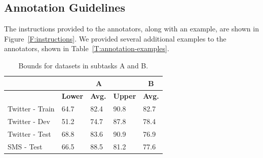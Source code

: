 \subsection{Annotation Guidelines}

The instructions provided to the annotators, along with an example, are shown in Figure~\ref{F:instructions}.
We provided several additional examples to the annotators, shown in Table~\ref{T:annotation-examples}.

 \begin{table}[t]
\small
\begin{center}
\begin{tabular}{| l | l | l | l | l |}
\hline
& \multicolumn{3}{|c|}{\bf A} & \multicolumn{1}{|c|}{\bf B} \\
\hline
& \bf Lower & \bf Avg. & \bf Upper & \bf Avg. \\
\hline
Twitter - Train & 64.7 & 82.4 & 90.8 & 82.7\\
Twitter - Dev & 51.2 & 74.7 & 87.8 & 78.4\\
Twitter - Test & 68.8 & 83.6 & 90.9 & 76.9\\
SMS - Test & 66.5 & 88.5 & 81.2 & 77.6\\
\hline
\end{tabular}
\caption{Bounds for datasets in subtasks A and B.}
\label{T:bounds}
\end{center}
\end{table}

